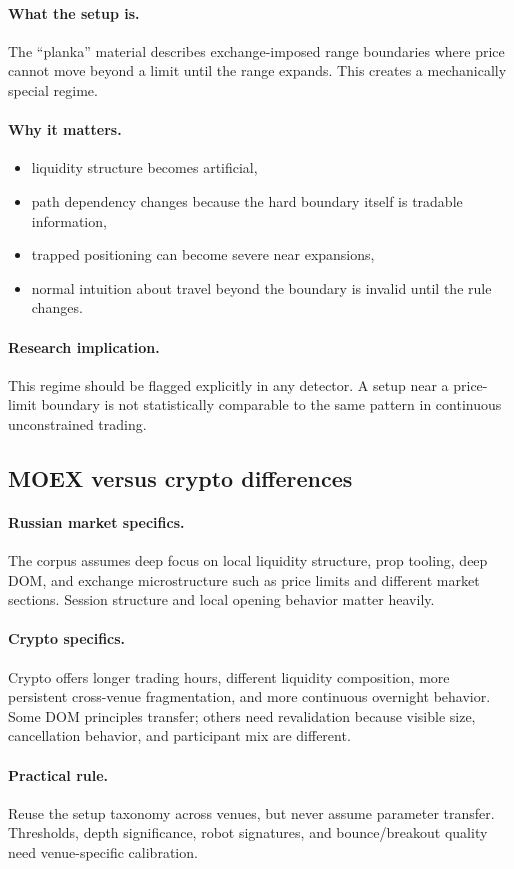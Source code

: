 \paragraph{What the setup is.} The ``planka'' material describes exchange-imposed range boundaries where price cannot move beyond a limit until the range expands. This creates a mechanically special regime.

\paragraph{Why it matters.}
\begin{itemize}
\item liquidity structure becomes artificial,
\item path dependency changes because the hard boundary itself is tradable information,
\item trapped positioning can become severe near expansions,
\item normal intuition about travel beyond the boundary is invalid until the rule changes.
\end{itemize}

\paragraph{Research implication.} This regime should be flagged explicitly in any detector. A setup near a price-limit boundary is not statistically comparable to the same pattern in continuous unconstrained trading.

\subsection{MOEX versus crypto differences}

\paragraph{Russian market specifics.} The corpus assumes deep focus on local liquidity structure, prop tooling, deep DOM, and exchange microstructure such as price limits and different market sections. Session structure and local opening behavior matter heavily.

\paragraph{Crypto specifics.} Crypto offers longer trading hours, different liquidity composition, more persistent cross-venue fragmentation, and more continuous overnight behavior. Some DOM principles transfer; others need revalidation because visible size, cancellation behavior, and participant mix are different.

\paragraph{Practical rule.} Reuse the setup taxonomy across venues, but never assume parameter transfer. Thresholds, depth significance, robot signatures, and bounce/breakout quality need venue-specific calibration.

